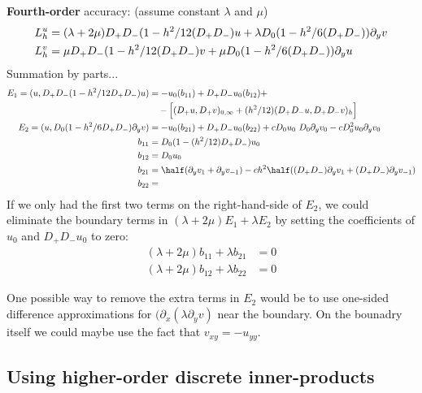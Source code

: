 \clearpage 
{\bf Fourth-order} accuracy: (assume constant $\lambda$ and $\mu$)
\begin{align*}
   L^u_h & = (\lambda+ 2\mu) D_+D_-(1-h^2/12(D_+D_-) u + \lambda D_0(1-h^2/6(D_+D_-))\partial_y v \\
   L^v_h &=  \mu D_+D_-(1-h^2/12(D_+D_-)v  + \mu D_0(1-h^2/6(D_+D_-))\partial_y u
\end{align*}
Summation by parts...
\begin{align*}
 E_1 =  (u, D_+D_-(1-h^2/12 D_+D_-)u)  &= -u_0( b_{11} ) + D_+D_- u_0 ( b_{12} )  + \\
                                & ~~~ - \Big[ (D_+ u, D_+ v)_{0,\infty} + (h^2/12)(D_+D_-u,D_+D_-v)_h \Big] \\
 E_2 =  (u, D_0(1-h^2/6D_+D_-)\vy) &= -u_0( b_{21} ) + D_+D_- u_0( b_{22} ) + c D_0 u_0 ~D_0 \vy_0 - c D_0^2 u_0 \vy_0 \\
  b_{11} &= D_0 (1-(h^2/12)D_+D_-)u_0 \\
  b_{12}&=  D_0 u_0 \\
  b_{21} &= \half(\vy_1+\vy_{-1})  -c h^2 \half((D_+D_-)\vy_1+(D_+D_-)\vy_{-1}) \\
  b_{22} &= 
\end{align*}
If we only had the first two terms on the right-hand-side of $E_2$, we could eliminate the 
boundary terms in $(\lambda+ 2\mu) E_1 + \lambda E_2 $ by setting the coefficients of $u_0$ and $D_+D_- u_0$ to zero:
\begin{align*}
  (\lambda+ 2\mu) b_{11} + \lambda b_{21} &=0 \\
  (\lambda+ 2\mu) b_{12} + \lambda b_{22} &=0 
\end{align*}


One possible way to remove the extra terms in $E_2$ would be to use one-sided difference approximations for
$(\partial_x(\lambda\partial_y v)$ near the boundary. On the bounadry itself we could maybe use
the fact that $v_{xy}= -u_{yy}$. 




\clearpage
\subsection{Using higher-order discrete inner-products}

